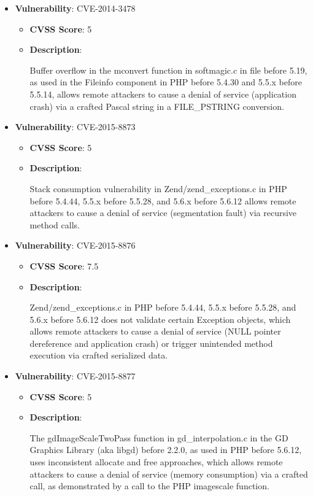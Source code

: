 \documentclass{article}
\begin{document}
\begin{itemize}
        \item \textbf{Vulnerability}: CVE-2014-3478
        \begin{itemize}
            \item \textbf{CVSS Score}:  5 
            \item \textbf{Description}:
            \parbox[t]{0.9\linewidth}{
                \ttfamily Buffer overflow in the mconvert function in softmagic.c in file before 5.19, as used in the Fileinfo component in PHP before 5.4.30 and 5.5.x before 5.5.14, allows remote attackers to cause a denial of service (application crash) via a crafted Pascal string in a FILE\_PSTRING conversion.
            }
        \end{itemize}
    
        \item \textbf{Vulnerability}: CVE-2015-8873
        \begin{itemize}
            \item \textbf{CVSS Score}:  5 
            \item \textbf{Description}:
            \parbox[t]{0.9\linewidth}{
                \ttfamily Stack consumption vulnerability in Zend/zend\_exceptions.c in PHP before 5.4.44, 5.5.x before 5.5.28, and 5.6.x before 5.6.12 allows remote attackers to cause a denial of service (segmentation fault) via recursive method calls.
            }
        \end{itemize}
    
        \item \textbf{Vulnerability}: CVE-2015-8876
        \begin{itemize}
            \item \textbf{CVSS Score}:  7.5 
            \item \textbf{Description}:
            \parbox[t]{0.9\linewidth}{
                \ttfamily Zend/zend\_exceptions.c in PHP before 5.4.44, 5.5.x before 5.5.28, and 5.6.x before 5.6.12 does not validate certain Exception objects, which allows remote attackers to cause a denial of service (NULL pointer dereference and application crash) or trigger unintended method execution via crafted serialized data.
            }
        \end{itemize}
    
        \item \textbf{Vulnerability}: CVE-2015-8877
        \begin{itemize}
            \item \textbf{CVSS Score}:  5 
            \item \textbf{Description}:
            \parbox[t]{0.9\linewidth}{
                \ttfamily The gdImageScaleTwoPass function in gd\_interpolation.c in the GD Graphics Library (aka libgd) before 2.2.0, as used in PHP before 5.6.12, uses inconsistent allocate and free approaches, which allows remote attackers to cause a denial of service (memory consumption) via a crafted call, as demonstrated by a call to the PHP imagescale function.
            }
        \end{itemize}
    

\end{itemize}
\end{document}
